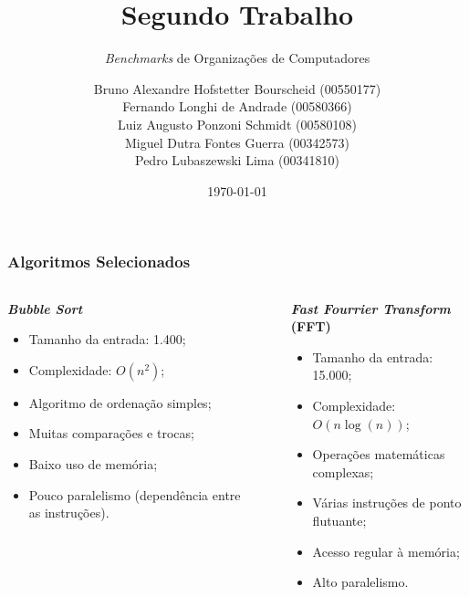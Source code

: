 \documentclass{beamer}
\title[Segundo Trabalho]{Segundo Trabalho}
\subtitle{\textit{Benchmarks} de Organizações de Computadores}
\author[Grupo 13]{Bruno Alexandre Hofstetter Bourscheid (00550177)
              \\ Fernando Longhi de Andrade (00580366)
              \\ Luiz Augusto Ponzoni Schmidt (00580108)
              \\ Miguel Dutra Fontes Guerra (00342573)
              \\ Pedro Lubaszewski Lima (00341810)}
\institute[]{INF01113\\Organização De Computadores B}
\date[\today]{\today}
\begin{document}
    \begin{frame}
        \maketitle
    \end{frame}

    \begin{frame}
        \frametitle{Algoritmos Selecionados}
        \begin{columns}
            \begin{column}{0.33\textwidth}

                \begin{center}
                    \textbf{\textit{Bubble Sort}}
                \end{center}

                \begin{itemize}
                    \footnotesize
                    \item Tamanho da entrada: 1.400;
                    \item Complexidade: $O(n^2)$;
                    \item Algoritmo de ordenação simples;
                    \item Muitas comparações e trocas;
                    \item Baixo uso de memória;
                    \item Pouco paralelismo (dependência entre as instruções).
                \end{itemize}

            \end{column}

            \begin{column}{0.01\textwidth}
                \rule{.1mm}{0.75\textheight}
            \end{column}

            \begin{column}{0.33\textwidth}

                \begin{center}
                    \textbf{\textit{Fast Fourrier Transform} (FFT)}
                \end{center}

                \begin{itemize}
                    \footnotesize
                    \item Tamanho da entrada: 15.000;
                    \item Complexidade: $O(n\log(n))$;
                    \item Operações matemáticas complexas;
                    \item Várias instruções de ponto flutuante;
                    \item Acesso regular à memória;
                    \item Alto paralelismo.
                \end{itemize}


\end{column}
\end{columns}
\end{frame}
\end{document}
